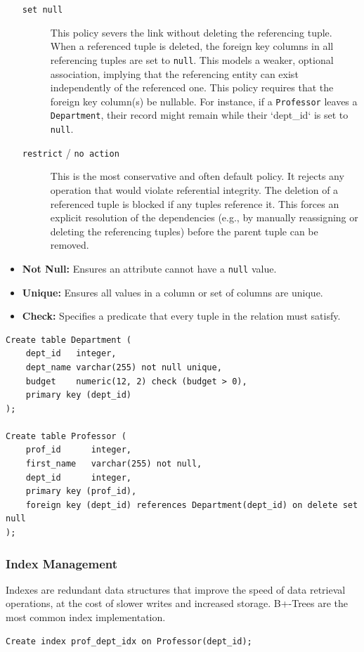 \begin{itemize}
\begin{description}
    \item[\texttt{set null}] This policy severs the link without deleting the referencing tuple. When a referenced tuple is deleted, the foreign key columns in all referencing tuples are set to \texttt{null}. This models a weaker, optional association, implying that the referencing entity can exist independently of the referenced one. This policy requires that the foreign key column(s) be nullable. For instance, if a \texttt{Professor} leaves a \texttt{Department}, their record might remain while their `dept\_id` is set to \texttt{null}.

    \item[\texttt{restrict} / \texttt{no action}] This is the most conservative and often default policy. It rejects any operation that would violate referential integrity. The deletion of a referenced tuple is blocked if any tuples reference it. This forces an explicit resolution of the dependencies (e.g., by manually reassigning or deleting the referencing tuples) before the parent tuple can be removed.
\end{description}
    \item \textbf{Not Null:} Ensures an attribute cannot have a \texttt{null} value.
    \item \textbf{Unique:} Ensures all values in a column or set of columns are unique.
    \item \textbf{Check:} Specifies a predicate that every tuple in the relation must satisfy.
\end{itemize}

\begin{verbatim}
Create table Department (
    dept_id   integer,
    dept_name varchar(255) not null unique,
    budget    numeric(12, 2) check (budget > 0),
    primary key (dept_id)
);

Create table Professor (
    prof_id      integer,
    first_name   varchar(255) not null,
    dept_id      integer,
    primary key (prof_id),
    foreign key (dept_id) references Department(dept_id) on delete set null
);
\end{verbatim}

\subsubsection{Index Management}
Indexes are redundant data structures that improve the speed of data retrieval operations, at the cost of slower writes and increased storage. B+-Trees are the most common index implementation.
\begin{verbatim}
Create index prof_dept_idx on Professor(dept_id);
\end{verbatim}

